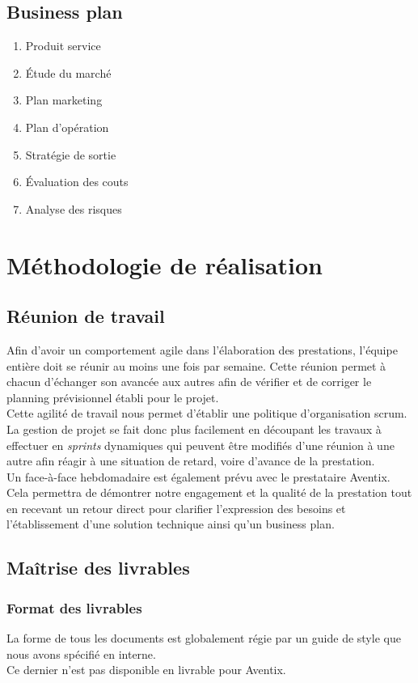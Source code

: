 \subsection{Business plan}
\begin{enumerate}
  \item Produit service
  \item Étude du marché
  \item Plan marketing
  \item Plan d'opération
  \item Stratégie de sortie
  \item Évaluation des couts
  \item Analyse des risques
\end{enumerate}

\section{Méthodologie de réalisation}
\subsection{Réunion de travail}
Afin d'avoir un comportement agile dans l'élaboration des prestations, l'équipe
entière doit se réunir au moins une fois par semaine. Cette réunion permet à
chacun d'échanger son avancée aux autres afin de vérifier et de corriger le
planning prévisionnel établi pour le projet. \\

Cette agilité de travail nous permet d'établir une politique d'organisation
scrum. La gestion de projet se fait donc plus facilement en découpant les
travaux à effectuer en \textit{sprints} dynamiques qui peuvent être modifiés
d'une réunion à une autre afin réagir à une situation de retard, voire d'avance
de la prestation. \\

Un face-à-face hebdomadaire est également prévu avec le prestataire Aventix.
Cela permettra de démontrer notre engagement et la qualité de la prestation
tout en recevant un retour direct pour clarifier l'expression des besoins et
l'établissement d'une solution technique ainsi qu'un business plan. \\

\subsection{Maîtrise des livrables}
\subsubsection{Format des livrables}
La forme de tous les documents est globalement régie par un guide de style que
nous avons spécifié en interne. \\
Ce dernier n'est pas disponible en livrable pour Aventix. \\

